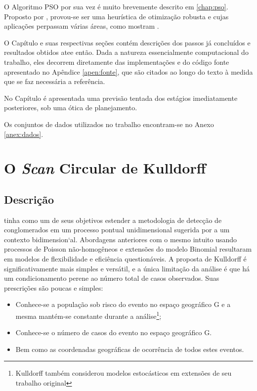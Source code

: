 \documentclass[
	12pt,				%
	openright,			%
	twoside,			%
	a4paper,			%
	english,			%
	brazil,				%
	]{abntex2}
\begin{document}
O Algoritmo PSO por sua vez é muito brevemente descrito em \ref{chap:pso}. Proposto por \cite{eberhart1995new}, provou-se ser uma heurística de otimização robusta e cujas aplicações perpassam várias áreas, como mostram \cite{shi2001particle}.

O Capítulo  e suas respectivas seções contém descrições dos passos já concluídos e resultados obtidos atee então. Dada a natureza essencialmente computacional do trabalho, eles decorrem diretamente das implementações e do código fonte apresentado no Apêndice \ref{apen:fonte}, que são citados ao longo do texto à medida que se faz necessária a referência.

No Capítulo  é apresentada uma previsão tentada dos estágios imediatamente posteriores, sob uma ótica de planejamento.

Os conjuntos de dados utilizados no trabalho encontram-se no Anexo \ref{anex:dados}.


\chapter{O \textit{Scan} Circular de Kulldorff}
\label{chap:ksc}

\section{Descrição}
\cite{kulldorff1997spatial} tinha como um de seus objetivos estender a metodologia de detecção de conglomerados em um processo pontual unidimensional sugerida por \cite{naus1965distribution} a um contexto bidimension`al. Abordagens anteriores com o mesmo intuito usando processos de Poisson não-homogêneos \cite{weinstock1981generalised} e extensões do modelo Binomial \cite{saperstein1972generalized} resultaram em modelos de flexibilidade e eficiência questionáveis. A proposta de Kulldorff é significativamente mais simples e versátil, e a única limitação da análise é que há um condicionamento perene ao número total de casos observados. Suas prescrições são poucas e simples:

\begin{itemize}
\item Conhece-se a população sob risco do evento no espaço geográfico G e a mesma mantém-se constante durante a análise\footnote{Kulldorff também considerou modelos estocásticos em extensões de seu trabalho original};
\item Conhece-se o número de casos do evento no espaço geográfico G.
\item Bem como as coordenadas geográficas de ocorrência de todos estes eventos.
\end{itemize}
\end{document}
